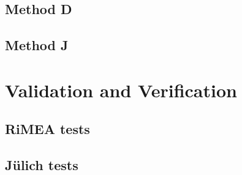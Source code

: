 \documentclass[%
paper=A4,					%
twoside=true,				%
openright,					%
parskip=full,				%
chapterprefix=true,			%
11pt,						%
headings=normal,			%
bibliography=totoc,			%
listof=totoc,				%
titlepage=on,				%
captions=tableabove,		%
draft=false,				%
]{scrreprt}%
\begin{document}
\subsection{Method D}

\newpage
\subsection{Method J}


\newpage
\section{Validation and Verification}
\subsection{RiMEA tests}

\newpage
\subsection{J\"ulich tests}



% 
% 

\end{document}
